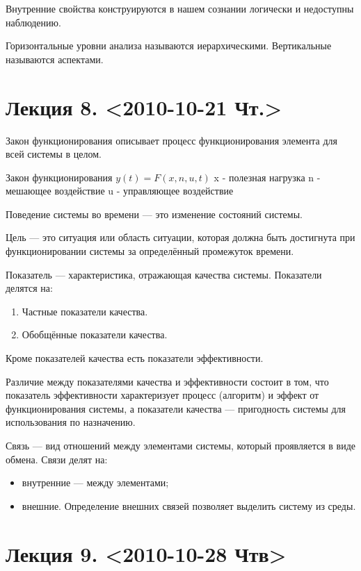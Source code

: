 \documentclass[12pt, russian, oneside, article]{ncc}
\begin{document}
Внутренние свойства конструируются в нашем сознании логически и недоступны наблюдению.

Горизонтальные уровни анализа называются иерархическими. Вертикальные называются аспектами.
\section{Лекция 8. <2010-10-21 Чт.>}
\label{sec-8}


Закон функционирования описывает процесс функционирования элемента для всей системы в целом.

Закон функционирования
$y(t) = F(x, n, u, t)$
x - полезная нагрузка
n - мешающее воздействие
u - управляющее воздействие

Поведение системы во времени --- это изменение состояний системы.

Цель --- это ситуация или область ситуации, которая должна быть достигнута при функционировании системы за определённый промежуток времени.

Показатель --- характеристика, отражающая качества системы.
Показатели делятся на:
\begin{enumerate}
\item Частные показатели качества.
\item Обобщённые показатели качества.
\end{enumerate}

Кроме показателей качества есть показатели эффективности.

Различие между показателями качества и эффективности состоит в том, что показатель эффективности характеризует процесс (алгоритм) и эффект от функционирования системы, а показатели качества --- пригодность системы для использования по назначению.

Связь --- вид отношений между элементами системы, который проявляется в виде обмена. Связи делят на:
\begin{itemize}
\item внутренние --- между элементами;
\item внешние. Определение внешних связей позволяет выделить систему из среды.
\end{itemize}
\section{Лекция 9. <2010-10-28 Чтв>}
\label{sec-9}
\end{document}
